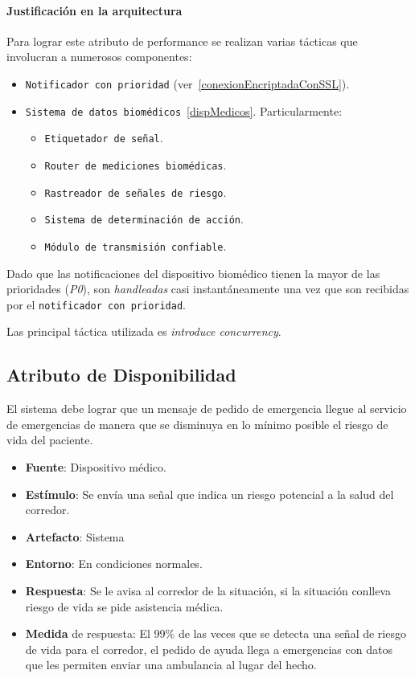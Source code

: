 \paragraph{Justificación en la arquitectura}
Para lograr este atributo de performance se realizan varias tácticas que involucran a numerosos componentes: 
\begin{itemize}
  \item \texttt{Notificador con prioridad} (ver~\ref{conexionEncriptadaConSSL}).
  \item \texttt{Sistema de datos biomédicos}~\ref{dispMedicos}. Particularmente: 
  \begin{itemize}
    \item \texttt{Etiquetador de señal}.
    \item \texttt{Router de mediciones biomédicas}.
    \item \texttt{Rastreador de señales de riesgo}.
    \item \texttt{Sistema de determinación de acción}.
    \item \texttt{Módulo de transmisión confiable}.
  \end{itemize}
\end{itemize}

Dado que las notificaciones del dispositivo biomédico tienen la mayor de las prioridades (\emph{P0}), son \emph{handleadas} casi instantáneamente una vez que son recibidas por el \texttt{notificador con prioridad}. 

Las principal táctica utilizada es \emph{introduce concurrency}. 

\subsection{Atributo de Disponibilidad}

El sistema debe lograr que un mensaje de pedido de emergencia llegue al servicio de emergencias de manera que se disminuya en lo mínimo posible el riesgo de vida del paciente.

\begin{itemize}
  \item \textbf{Fuente}: Dispositivo médico.
  \item \textbf{Estímulo}: Se envía una señal que indica un riesgo potencial a la salud del corredor.
  \item \textbf{Artefacto}: Sistema
  \item \textbf{Entorno}: En condiciones normales.
  \item \textbf{Respuesta}: Se le avisa al corredor de la situación, si la situación conlleva riesgo de vida se pide asistencia médica.
  \item \textbf{Medida} de respuesta: El 99\% de las veces que se detecta una señal de riesgo de vida para el corredor, el pedido de ayuda llega a emergencias con datos que les permiten enviar una ambulancia al lugar del hecho.
\end{itemize}

